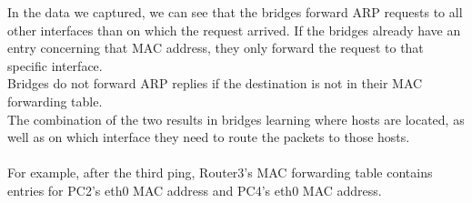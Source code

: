 In the data we captured, we can see that the bridges forward ARP requests to all other interfaces than on which the request arrived. If the bridges already have an entry concerning that MAC address, they only forward the request to that specific interface. \\
Bridges do not forward ARP replies if the destination is not in their MAC forwarding table. \\
The combination of the two results in bridges learning where hosts are located, as well as on which interface they need to route the packets to those hosts.
\\ \\
For example, after the third ping, Router3's MAC forwarding table contains entries for PC2's eth0 MAC address and PC4's eth0 MAC address. \\


